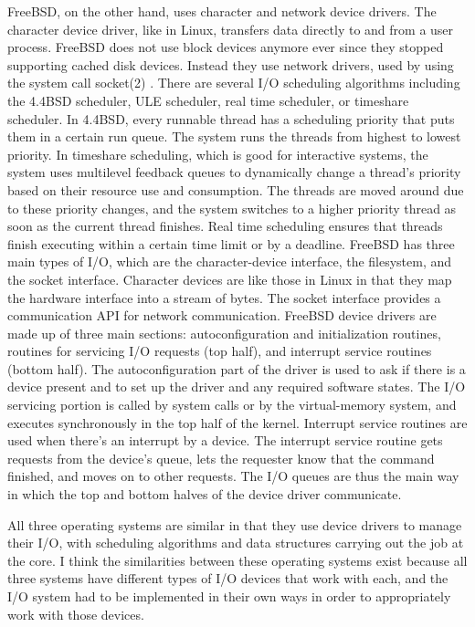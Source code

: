 \documentclass[10pt,draftclsnofoot,onecolumn,letterpaper]{IEEEtran}
\begin{document}
FreeBSD, on the other hand, uses character and network device drivers. The character device driver, like in Linux, transfers data directly to and from a user process. FreeBSD does not use block devices anymore ever since they stopped supporting cached disk devices. Instead they use network drivers, used by using the system call socket(2) \cite{6}.
There are several I/O scheduling algorithms including the 4.4BSD scheduler, ULE scheduler, real time scheduler, or timeshare scheduler. In 4.4BSD, every runnable thread has a scheduling priority that puts them in a certain run queue. The system runs the threads from highest to lowest priority\cite{5}. In timeshare scheduling, which is good for interactive systems, the system uses multilevel feedback queues to dynamically change a thread's priority based on their resource use and consumption. The threads are moved around due to these priority changes, and the system switches to a higher priority thread as soon as the current thread finishes\cite{7}. Real time scheduling ensures that threads finish executing within a certain time limit or by a deadline.
FreeBSD has three main types of I/O, which are the character-device interface, the filesystem, and the socket interface. Character devices are like those in Linux in that they map the hardware interface into a stream of bytes. The socket interface provides a communication API for network communication\cite{5}.
FreeBSD device drivers are made up of three main sections: autoconfiguration and initialization routines, routines for servicing I/O requests (top half), and interrupt service routines (bottom half). The autoconfiguration part of the driver is used to ask if there is a device present and to set up the driver and any required software states. The I/O servicing portion is called by system calls or by the virtual-memory system, and executes synchronously in the top half of the kernel\cite{5}. Interrupt service routines are used when there's an interrupt by a device. The interrupt service routine gets requests from the device's queue, lets the requester know that the command finished, and moves on to other requests. The I/O queues are thus the main way in which the top and bottom halves of the device driver communicate\cite{5}.

All three operating systems are similar in that they use device drivers to manage their I/O, with scheduling algorithms and data structures carrying out the job at the core. I think the similarities between these operating systems exist because all three systems have different types of I/O devices that work with each, and the I/O system had to be implemented in their own ways in order to appropriately work with those devices.



{}
\end{document}
